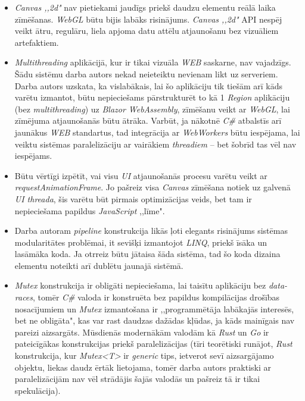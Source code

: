\begin{itemize}
    \item \emph{Canvas ,,2d"} nav pietiekami jaudīgs priekš daudzu elementu reālā laika
    zīmēšanas. \emph{WebGL} būtu bijis labāks risinājums. \emph{Canvas ,,2d"} API nespēj veikt
    ātru, regulāru, liela apjoma datu attēlu atjaunošanu bez vizuāliem artefaktiem.

    \item \emph{Multithreading} aplikācijā, kur ir tikai vizuāla \emph{WEB} saskarne, nav vajadzīgs.
    Šādu sistēmu darba autors nekad neieteiktu nevienam likt uz serveriem.
    Darba autors uzskata, ka vislabākais, lai šo aplikāciju tik tiešām arī kāds
    varētu izmantot, būtu nepieciešams pārstrukturēt to kā 1 \emph{Region} aplikāciju
    (bez \emph{multithreading}) uz \emph{Blazor WebAssembly}, zīmēšanu veikt ar
    \emph{WebGL}, lai zīmējuma atjaunošanās būtu ātrāka. Varbūt, ja nākotnē \emph{C\#}
    atbalstīs arī jaunākus \emph{WEB} standartus, tad integrācija ar
    \emph{WebWorkers} būtu iespējama, lai veiktu sistēmas paralelizāciju ar vairākiem
    \emph{threadiem} -- bet šobrīd tas vēl nav iespējams.

    \item Būtu vērtīgi izpētīt, vai visu \emph{UI} atjaunošanās procesu varētu veikt ar
    \emph{requestAnimationFrame}\cite{web:req-anim-frame}. Jo pašreiz visa \emph{Canvas}
    zīmēšana notiek uz galvenā \emph{UI threada}, šis varētu būt pirmais
    optimizācijas veids, bet tam ir nepieciešama papildus \emph{JavaScript} ,,līme".

    \item Darba autoram \emph{pipeline} konstrukcija likās ļoti elegants risinājums
    sistēmas modularitātes problēmai, it sevišķi izmantojot \emph{LINQ}, priekš īsāka un lasāmāka
    koda. Ja otrreiz būtu jātaisa šāda sistēma, tad šo koda dizaina elementu
    noteikti arī dublētu jaunajā sistēmā.

    \item \emph{Mutex} konstrukcija ir obligāti nepieciešama, lai taisītu aplikāciju
    bez \emph{data-races}, tomēr \emph{C\#} valoda ir konstruēta bez papildus kompilācijas
    drošības nosacījumiem un \emph{Mutex} izmantošana ir ,,programmētāja labākajās
    interesēs, bet ne obligāta", kas var rast daudzas dažādas kļūdas, ja kāds mainīgais
    nav pareizi aizsargāts. Mūsdienās modernākām valodām kā \emph{Rust} un \emph{Go}
    ir pateicīgākas konstrukcijas priekš paralelizācijas (tīri teorētiski runājot,
    \emph{Rust} konstrukcija, kur \emph{Mutex<T>} ir \emph{generic} tips, ietverot
    sevī aizsargājamo objektu, liekas daudz ērtāk lietojama, tomēr
    darba autors praktiski ar paralelizācijām nav vēl strādājis šajās valodās un
    pašreiz tā ir tikai spekulācija).
\end{itemize}

